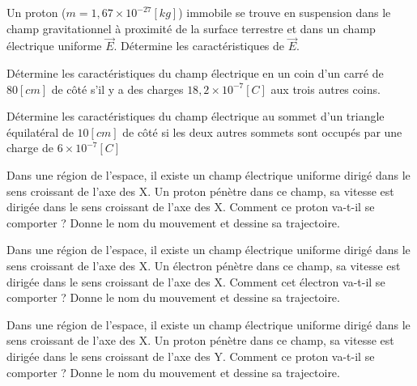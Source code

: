 \begin{exercise}
    Un proton (\(m=1,67 \times 10^{-27}[kg]\)) immobile se trouve en suspension dans le champ gravitationnel à proximité de la surface terrestre et dans un champ électrique uniforme \(\vec{E}\). Détermine les caractéristiques de \(\vec{E}\).
\end{exercise}

\begin{exercise}
    Détermine les caractéristiques du champ électrique en un coin d'un carré de \(80[cm]\) de côté s'il y a des charges \(18,2 \times 10^{-7}[C]\) aux trois autres coins.
\end{exercise}

\begin{exercise}
    Détermine les caractéristiques du champ électrique au sommet d'un triangle équilatéral de \(10[cm]\) de côté si les deux autres sommets sont occupés par une charge de \(6 \times 10^{-7}[C]\)
\end{exercise}

\begin{exercise}
    Dans une région de l'espace, il existe un champ électrique uniforme dirigé dans le sens croissant de l'axe des X. Un proton pénètre dans ce champ, sa vitesse est dirigée dans le sens croissant de l'axe des X. Comment ce proton va-t-il se comporter ? Donne le nom du mouvement et dessine sa trajectoire.
\end{exercise}

\begin{exercise}
    Dans une région de l'espace, il existe un champ électrique uniforme dirigé dans le sens croissant de l'axe des X. Un électron pénètre dans ce champ, sa vitesse est dirigée dans le sens croissant de l'axe des X. Comment cet électron va-t-il se comporter ? Donne le nom du mouvement et dessine sa trajectoire.
\end{exercise}

\begin{exercise}
    Dans une région de l'espace, il existe un champ électrique uniforme dirigé dans le sens croissant de l'axe des X. Un proton pénètre dans ce champ, sa vitesse est dirigée dans le sens croissant de l'axe des Y. Comment ce proton va-t-il se comporter ? Donne le nom du mouvement et dessine sa trajectoire.
\end{exercise}
